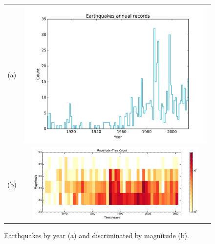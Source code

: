 \documentclass[draft, grl]{agutex}
\begin{document}
\begin{figure}
	\begin{center}
	\begin{table}[H]
		\begin{tabular}{ c c }
		\footnotesize(a)
		& \includegraphics[width=0.99\textwidth]{z_img_hmtk_bsb2014_11_rate}
		\\
		\footnotesize(b)
		& \includegraphics[width=0.90\textwidth]{z_img_time_mag_count_br_1960}
		\end{tabular}
	\end{table}
	\caption{Earthquakes by year (a) and discriminated by magnitude (b).}
	\label{fig_records}
	\end{center}
\end{figure}
\end{document}
